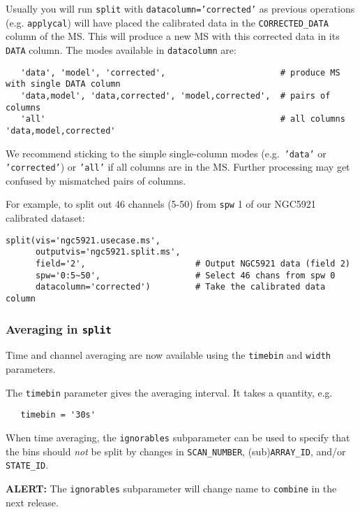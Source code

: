 Usually you will run {\tt split} with {\tt datacolumn='corrected'} as
previous operations (e.g. {\tt applycal}) will have placed the
calibrated data in the {\tt CORRECTED\_DATA} column of the MS.  This
will produce a new MS with this corrected data in its {\tt DATA} 
column.  The modes available in {\tt datacolumn} are:
\small
\begin{verbatim}
   'data', 'model', 'corrected',                       # produce MS with single DATA column
   'data,model', 'data,corrected', 'model,corrected',  # pairs of columns
   'all'                                               # all columns 'data,model,corrected'
\end{verbatim}
\normalsize
We recommend sticking to the simple single-column modes (e.g.\ 
{\tt 'data'} or {\tt 'corrected'}) or {\tt 'all'} if all columns are in
the MS.  Further processing may get confused by mismatched pairs of columns.

For example, to split out 46 channels (5-50) from {\tt spw} 1 of
our NGC5921 calibrated dataset:
\small
\begin{verbatim}
split(vis='ngc5921.usecase.ms',       
      outputvis='ngc5921.split.ms',    
      field='2',                      # Output NGC5921 data (field 2)
      spw='0:5~50',                   # Select 46 chans from spw 0
      datacolumn='corrected')         # Take the calibrated data column
\end{verbatim}
\normalsize

\subsubsection{Averaging in {\tt split}}
\label{section:cal.other.split.average}

Time and channel averaging are now available using the {\tt timebin}
and {\tt width} parameters.

The {\tt timebin} parameter gives the averaging interval.  It takes a
quantity, e.g.
\small
\begin{verbatim}
   timebin = '30s'
\end{verbatim}
\normalsize

When time averaging, the {\tt ignorables} subparameter can be used to
specify that the bins should \emph{not} be split by changes in
{\tt SCAN\_NUMBER}, (sub){\tt ARRAY\_ID}, and/or {\tt STATE\_ID}.

{\bf ALERT:} The {\tt ignorables} subparameter will change name to
{\tt combine} in the next release.


